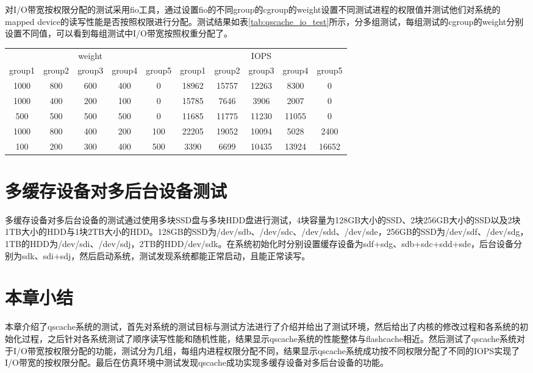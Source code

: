 对I/O带宽按权限分配的测试采用fio工具，通过设置fio的不同group的cgroup的weight设置不同测试进程的权限值并测试他们对系统的mapped device的读写性能是否按照权限进行分配。测试结果如表\ref{tab:qscache_io_test}所示，分多组测试，每组测试的cgroup的weight分别设置不同值，可以看到每组测试中I/O带宽按照权重分配了。

\begin{table}[!hpb]
    \centering
    \begin{tabular}{@{}cccccccccc@{}} 
        \toprule
        \multicolumn{5}{c}{weight} & \multicolumn{5}{c}{IOPS}\\
        group1 & group2 & group3 & group4 & group5 & group1 & group2 & group3 & group4 & group5 \\
        \midrule
        1000 & 800 & 600 & 400 & 0 & 18962 & 15757 & 12263 & 8300 & 0\\
        1000 & 400 & 200 & 100 & 0 & 15785 & 7646 & 3906 & 2007 & 0 \\ 
        500 & 500 & 500 & 500 & 0 & 11685 & 11775 & 11230 & 11055 & 0 \\ 
        1000 & 800 & 400 & 200 & 100 & 22205 & 19052 & 10094 & 5028 & 2400\\ 
        100 & 200 & 300 & 400 & 500 & 3390 & 6699 & 10435 & 13924 & 16652\\
        \bottomrule
    \end{tabular}
\end{table}

\section{多缓存设备对多后台设备测试}

多缓存设备对多后台设备的测试通过使用多块SSD盘与多块HDD盘进行测试，4块容量为128GB大小的SSD、2块256GB大小的SSD以及2块1TB大小的HDD与1块2TB大小的HDD。128GB的SSD为/dev/sdb、/dev/sdc、/dev/sdd、/dev/sde，256GB的SSD为/dev/sdf、/dev/sdg，1TB的HDD为/dev/sdi、/dev/sdj，2TB的HDD/dev/sdk。在系统初始化时分别设置缓存设备为sdf+sdg、sdb+sdc+sdd+sde，后台设备分别为sdk、sdi+sdj，然后启动系统，测试发现系统都能正常启动，且能正常读写。

\section{本章小结}

本章介绍了qscache系统的测试，首先对系统的测试目标与测试方法进行了介绍并给出了测试环境，然后给出了内核的修改过程和各系统的初始化过程，之后针对各系统测试了顺序读写性能和随机性能，结果显示qscache系统的性能整体与flashcache相近。然后测试了qscache系统对于I/O带宽按权限分配的功能，测试分为几组，每组内进程权限分配不同，结果显示qscache系统成功按不同权限分配了不同的IOPS实现了I/O带宽的按权限分配。最后在仿真环境中测试发现qscache成功实现多缓存设备对多后台设备的功能。